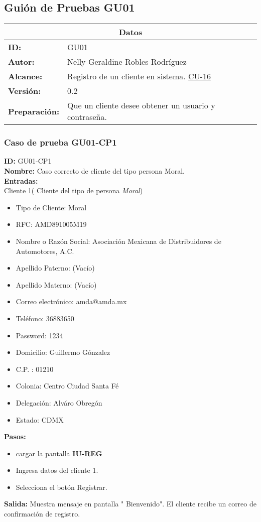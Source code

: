 \subsection{Guión de Pruebas GU01}
\begin{table}[htbp]
\centering
\begin{tabular}{|p{5cm}| p{13cm} |} \hline
\multicolumn{2}{|c|}{\textbf{Datos}} \\ \hline
    \textbf{ID:}&GU01\\ \hline
    \textbf{Autor:}&Nelly Geraldine Robles Rodríguez\\ \hline
    \textbf{Alcance:}&Registro de un cliente en sistema. \hyperlink{CU:CU16}{CU-16}\\ \hline
    \textbf {Versión:}&0.2 \\ \hline
    \textbf{Preparación:}&Que un cliente desee obtener un usuario y contraseña.\\ \hline
\end{tabular}
\end{table}

\subsubsection{Caso de prueba GU01-CP1}
\textbf{ID:} GU01-CP1\\
\textbf{Nombre:} Caso correcto de cliente del tipo persona Moral.\\
\textbf{Entradas:}\\
Cliente 1( Cliente del tipo de persona \textit{Moral})
\begin{itemize}
    \item Tipo de Cliente: Moral
    \item RFC: AMD891005M19
    \item Nombre o Razón Social: Asociación Mexicana de Distribuidores de Automotores, A.C.
    \item Apellido Paterno: (Vacío)
    \item Apellido Materno: (Vacío)
    \item Correo electrónico: amda@amda.mx
    \item Teléfono: 36883650
    \item Password: 1234
    \item Domicilio: Guillermo Gónzalez
    \item C.P. : 01210
    \item Colonia: Centro Ciudad Santa Fé
    \item Delegación: Alváro Obregón
    \item Estado: CDMX\\
\end{itemize}
\textbf{Pasos:}
\begin{itemize}
\item cargar la pantalla \textbf{IU-REG}
    \item Ingresa datos del cliente 1.
    \item Selecciona el botón Registrar.
\end{itemize}
\textbf{Salida:}
Muestra mensaje en pantalla " Bienvenido".
El cliente recibe un correo de confirmación de registro. 

